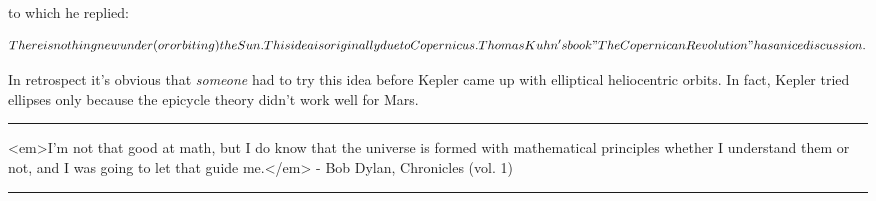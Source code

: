 to which he replied:


$$

There is nothing new under (or orbiting) the Sun.  This idea is
originally due to Copernicus.  Thomas Kuhn's book "The Copernican
Revolution" has a nice discussion.
$$
    

In retrospect it's obvious that \emph{someone} had to try this idea
before Kepler came up with elliptical heliocentric orbits. In fact,
Kepler tried ellipses only because the epicycle theory didn't work well 
for Mars.

\par\noindent\rule{\textwidth}{0.4pt}
<em>I'm not that good at math, but I do know that the universe
is formed with mathematical principles whether I understand them
or not, and I was going to let that guide me.</em> - Bob Dylan,
Chronicles (vol. 1)

\par\noindent\rule{\textwidth}{0.4pt}

